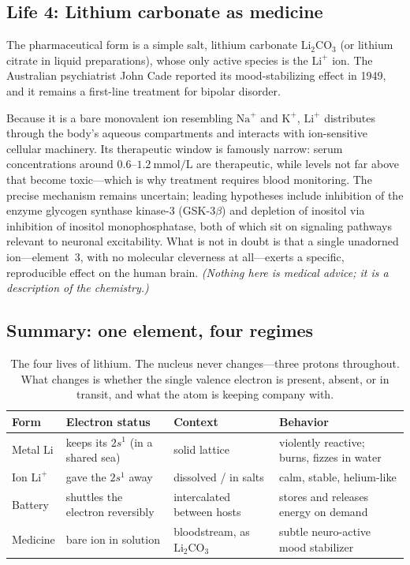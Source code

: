\documentclass[11pt, letterpaper]{article}
\newcommand{\Li}{\text{Li}}
\newcommand{\Lip}{\text{Li}^{+}}
\begin{document}
\subsection{Life 4: Lithium carbonate as medicine}

The pharmaceutical form is a simple salt, lithium carbonate $\text{Li}_2\text{CO}_3$ (or lithium citrate in liquid preparations), whose only active species is the $\Lip$ ion. The Australian psychiatrist John Cade reported its mood-stabilizing effect in 1949, and it remains a first-line treatment for bipolar disorder.

Because it is a bare monovalent ion resembling $\text{Na}^+$ and $\text{K}^+$, $\Lip$ distributes through the body's aqueous compartments and interacts with ion-sensitive cellular machinery. Its therapeutic window is famously narrow: serum concentrations around $0.6$--$1.2\ \text{mmol/L}$ are therapeutic, while levels not far above that become toxic---which is why treatment requires blood monitoring. The precise mechanism remains uncertain; leading hypotheses include inhibition of the enzyme glycogen synthase kinase-3 (GSK-3$\beta$) and depletion of inositol via inhibition of inositol monophosphatase, both of which sit on signaling pathways relevant to neuronal excitability. What is not in doubt is that a single unadorned ion---element~$3$, with no molecular cleverness at all---exerts a specific, reproducible effect on the human brain. \textit{(Nothing here is medical advice; it is a description of the chemistry.)}

\subsection{Summary: one element, four regimes}

\begin{table}[ht]
\centering
\renewcommand{\arraystretch}{1.35}
\begin{tabular}{@{}>{\raggedright}p{2.6cm} p{3.1cm} p{3.0cm} p{4.0cm}@{}}
\toprule
\textbf{Form} & \textbf{Electron status} & \textbf{Context} & \textbf{Behavior} \\
\midrule
Metal $\Li$ & keeps its $2s^1$ (in a shared sea) & solid lattice & violently reactive; burns, fizzes in water \\
Ion $\Lip$ & gave the $2s^1$ away & dissolved / in salts & calm, stable, helium-like \\
Battery & shuttles the electron reversibly & intercalated between hosts & stores and releases energy on demand \\
Medicine & bare ion in solution & bloodstream, as $\text{Li}_2\text{CO}_3$ & subtle neuro-active mood stabilizer \\
\bottomrule
\end{tabular}
\caption{The four lives of lithium. The nucleus never changes---three protons throughout. What changes is whether the single valence electron is present, absent, or in transit, and what the atom is keeping company with.}
\label{tab:summary}
\end{table}
\end{document}
